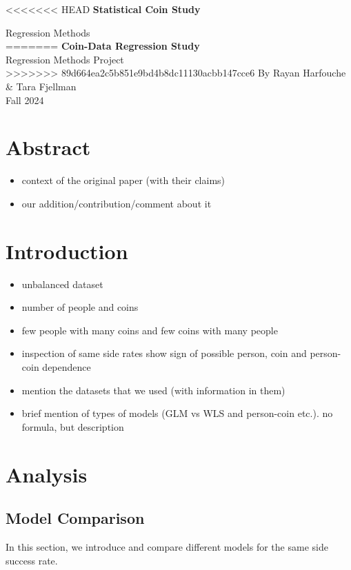 \documentclass[a4paper, 12pt,oneside]{article}
\begin{document}
 
	\begin{center}
	    \Large
<<<<<<< HEAD
	    \textbf{Statistical Coin Study}
	        
	    \vspace{0.4cm}
	    \large
		Regression Methods \\
=======
	    \textbf{Coin-Data Regression Study}\\
	    \large
		Regression Methods Project \\
>>>>>>> 89d664ea2c5b851e9bd4b8dc11130acbb147cce6
	    By Rayan Harfouche \& Tara Fjellman \\
	    \small{Fall 2024}
	\end{center}
	\section*{Abstract}
	\begin{itemize}
		\item context of the original paper (with their claims) 
		\item our addition/contribution/comment about it
	\end{itemize}
	\section{Introduction}
	\begin{itemize}
		\item unbalanced dataset 
		\item number of people and coins
		\item few people with many coins and few coins with many people
		\item inspection of same side rates show sign of possible person, coin and person-coin dependence
		\item mention the datasets that we used (with information in them)
		\item brief mention of types of models (GLM vs WLS and person-coin etc.). no formula, but description
	\end{itemize}
	\section{Analysis}
		\subsection{Model Comparison}
			In this section, we introduce and compare different models for the same side success rate. 
\end{document}
